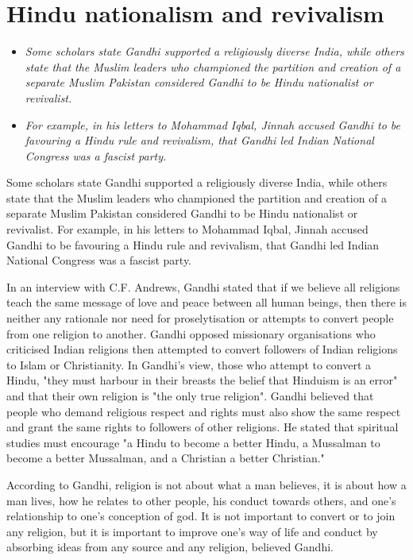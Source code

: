\section{Hindu nationalism and
revivalism}\label{hindu-nationalism-and-revivalism}

\begin{itemize}
\item
  \emph{Some scholars state Gandhi supported a religiously diverse
  India, while others state that the Muslim leaders who championed the
  partition and creation of a separate Muslim Pakistan considered Gandhi
  to be Hindu nationalist or revivalist.}
\item
  \emph{For example, in his letters to Mohammad Iqbal, Jinnah accused
  Gandhi to be favouring a Hindu rule and revivalism, that Gandhi led
  Indian National Congress was a fascist party.}
\end{itemize}

Some scholars state Gandhi supported a religiously diverse India, while
others state that the Muslim leaders who championed the partition and
creation of a separate Muslim Pakistan considered Gandhi to be Hindu
nationalist or revivalist. For example, in his letters to Mohammad
Iqbal, Jinnah accused Gandhi to be favouring a Hindu rule and
revivalism, that Gandhi led Indian National Congress was a fascist
party.

In an interview with C.F. Andrews, Gandhi stated that if we believe all
religions teach the same message of love and peace between all human
beings, then there is neither any rationale nor need for proselytisation
or attempts to convert people from one religion to another. Gandhi
opposed missionary organisations who criticised Indian religions then
attempted to convert followers of Indian religions to Islam or
Christianity. In Gandhi's view, those who attempt to convert a Hindu,
"they must harbour in their breasts the belief that Hinduism is an
error" and that their own religion is "the only true religion". Gandhi
believed that people who demand religious respect and rights must also
show the same respect and grant the same rights to followers of other
religions. He stated that spiritual studies must encourage "a Hindu to
become a better Hindu, a Mussalman to become a better Mussalman, and a
Christian a better Christian."

According to Gandhi, religion is not about what a man believes, it is
about how a man lives, how he relates to other people, his conduct
towards others, and one's relationship to one's conception of god. It is
not important to convert or to join any religion, but it is important to
improve one's way of life and conduct by absorbing ideas from any source
and any religion, believed Gandhi.

